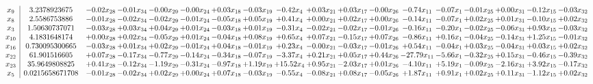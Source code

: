 \documentclass[9pt]{article}
\begin{document}
 \[\begin{array}{c| c c@{\hskip 2pt} c@{\hskip 2pt} c@{\hskip 2pt} c@{\hskip 2pt} c@{\hskip 2pt} c@{\hskip 2pt} c@{\hskip 2pt} c@{\hskip 2pt} c@{\hskip 2pt} c@{\hskip 2pt} c@{\hskip 2pt} c@{\hskip 2pt} c@{\hskip 2pt} c@{\hskip 2pt} c@{\hskip 2pt} c@{\hskip 2pt} }
 x_{9}   &  3.2378923675 & -0.02 x_{28} & -0.01 x_{34} & -0.00 x_{29} & -0.00 x_{24} & +  0.03 x_{18} & -0.03 x_{19} & -0.42 x_{4} & +  0.03 x_{21} & +  0.03 x_{17} & -0.00 x_{26} & -0.74 x_{11} & -0.07 x_{1} & -0.01 x_{25} & +  0.00 x_{31} & -0.12 x_{15} & -0.03 x_{32}\\
 x_{8}   &  2.5586753886 & -0.01 x_{28} & -0.02 x_{34} & -0.02 x_{29} & -0.01 x_{24} & -0.05 x_{18} & +  0.05 x_{19} & +  0.41 x_{4} & +  0.00 x_{21} & +  0.02 x_{17} & +  0.00 x_{26} & -0.14 x_{11} & -0.07 x_{1} & +  0.02 x_{25} & +  0.01 x_{31} & -0.10 x_{15} & +  0.02 x_{32}\\
 x_{3}   &  1.50630737071 & -0.03 x_{28} & +  0.03 x_{34} & +  0.04 x_{29} & +  0.01 x_{24} & -0.03 x_{18} & +  0.01 x_{19} & -0.31 x_{4} & -0.02 x_{21} & -0.02 x_{17} & -0.01 x_{26} & -0.16 x_{11} & -0.20 x_{1} & -0.02 x_{25} & -0.06 x_{31} & +  0.93 x_{15} & -0.03 x_{32}\\
 x_{10}   &  4.1831648174 & +  0.00 x_{28} & +  0.02 x_{34} & -0.05 x_{29} & +  0.01 x_{24} & -0.04 x_{18} & +  0.08 x_{19} & +  0.65 x_{4} & +  0.07 x_{21} & -0.15 x_{17} & +  0.07 x_{26} & -0.86 x_{11} & +  0.16 x_{1} & -0.04 x_{25} & -0.14 x_{31} & +  1.25 x_{15} & -0.01 x_{32}\\
 x_{16}   &  0.730095300665 & -0.03 x_{28} & +  0.01 x_{34} & +  0.02 x_{29} & -0.01 x_{24} & +  0.04 x_{18} & -0.01 x_{19} & +  0.23 x_{4} & -0.00 x_{21} & -0.03 x_{17} & -0.01 x_{26} & +  0.54 x_{11} & -0.04 x_{1} & +  0.03 x_{25} & -0.04 x_{31} & +  0.03 x_{15} & +  0.02 x_{32}\\
 x_{22}   &  61.901516605 & +  0.07 x_{28} & -0.17 x_{34} & -0.77 x_{29} & -0.14 x_{24} & -0.34 x_{18} & -0.07 x_{19} & -3.37 x_{4} & +  0.21 x_{21} & +  0.05 x_{17} & +  0.44 x_{26} & -27.79 x_{11} & -5.66 x_{1} & -0.32 x_{25} & +  0.15 x_{31} & -0.46 x_{15} & -0.39 x_{32}\\
 x_{23}   &  35.9649808825 & +  0.41 x_{28} & -0.12 x_{34} & -1.19 x_{29} & -0.31 x_{24} & -0.97 x_{18} & +  1.19 x_{19} & + 15.52 x_{4} & +  0.95 x_{21} & -2.03 x_{17} & +  0.01 x_{26} & -4.10 x_{11} & +  5.19 x_{1} & -0.09 x_{25} & -2.16 x_{31} & +  3.92 x_{15} & -0.17 x_{32}\\
 x_{5}   &  0.0215658671708 & -0.01 x_{28} & -0.02 x_{34} & +  0.02 x_{29} & +  0.00 x_{24} & +  0.07 x_{18} & -0.03 x_{19} & -0.55 x_{4} & -0.08 x_{21} & +  0.08 x_{17} & -0.05 x_{26} & +  1.87 x_{11} & +  0.91 x_{1} & +  0.02 x_{25} & +  0.11 x_{31} & -1.12 x_{15} & +  0.02 x_{32}\\

\end{array}\]
\end{document}
